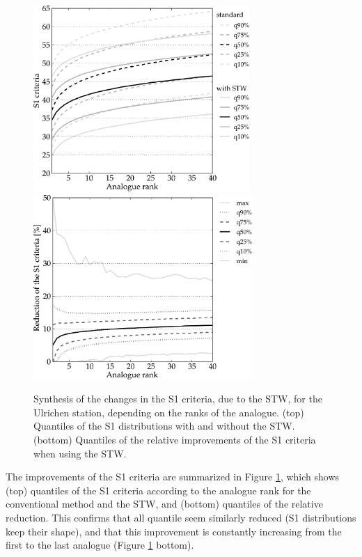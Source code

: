 \documentclass[hess]{copernicus}
\begin{document}
\begin{figure}[htb]
	\begin{center}
		\includegraphics[width=8.2cm]{figures/changes_S1_value.pdf} \\
		\includegraphics[width=8.3cm]{figures/changes_S1_gain.pdf}
	\end{center}
	\caption{Synthesis of the changes in the S1 criteria, due to the STW, for the Ulrichen station, depending on the ranks of the analogue. (top) Quantiles of the S1 distributions with and without the STW. (bottom) Quantiles of the relative improvements of the S1 criteria when using the STW.}
	\label{fig:changes_S1}
\end{figure}

The improvements of the S1 criteria are summarized in Figure \ref{fig:changes_S1}, which shows (top) quantiles of the S1 criteria according to the analogue rank for the conventional method and the STW, and (bottom) quantiles of the relative reduction. This confirms that all quantile seem similarly reduced (S1 distributions keep their shape), and that this improvement is constantly increasing from the first to the last analogue (Figure \ref{fig:changes_S1} bottom).
\end{document}
